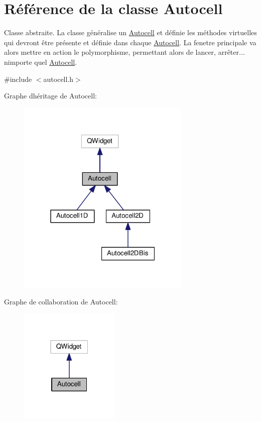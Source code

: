 \hypertarget{class_autocell}{}\section{Référence de la classe Autocell}
\label{class_autocell}


Classe abstraite. La classe généralise un \hyperlink{class_autocell}{Autocell} et définie les méthodes virtuelles qui devront être présente et définie dans chaque \hyperlink{class_autocell}{Autocell}. La fenetre principale va alors mettre en action le polymorphisme, permettant alors de lancer, arrêter... n\textquotesingle{}importe quel \hyperlink{class_autocell}{Autocell}.  




{\ttfamily \#include $<$autocell.\+h$>$}



Graphe d\textquotesingle{}héritage de Autocell\+:\nopagebreak
\begin{figure}[H]
\begin{center}
\leavevmode
\includegraphics[width=235pt]{class_autocell__inherit__graph}
\end{center}
\end{figure}


Graphe de collaboration de Autocell\+:\nopagebreak
\begin{figure}[H]
\begin{center}
\leavevmode
\includegraphics[width=135pt]{class_autocell__coll__graph}
\end{center}
\end{figure}
